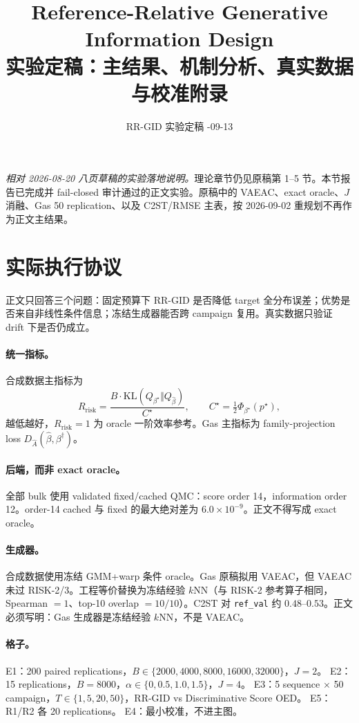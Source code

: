 \documentclass[UTF8,a4paper,11pt]{ctexart}
\title{\vspace{-8mm}Reference-Relative Generative Information Design\\[4pt]
\large 实验定稿：主结果、机制分析、真实数据与校准附录}
\author{RR-GID 实验定稿 \quad 2026-09-13}
\date{}
\begin{document}
\maketitle
\vspace{-6mm}
\noindent\textit{相对 2026-08-20 八页草稿的实验落地说明。}理论章节仍见原稿第 1--5 节。本节报告已完成并 fail-closed 审计通过的正文实验。原稿中的 VAEAC、exact oracle、\(J\) 消融、Gas 50 replication、以及 C2ST/RMSE 主表，按 2026-09-02 重规划不再作为正文主结果。

\section{实际执行协议}

正文只回答三个问题：固定预算下 RR-GID 是否降低 target 全分布误差；优势是否来自非线性条件信息；冻结生成器能否跨 campaign 复用。真实数据只验证 drift 下是否仍成立。

\paragraph{统一指标。}
合成数据主指标为
\[
R_{\mathrm{risk}}=\frac{B\cdot\mathrm{KL}(Q_{\beta^\star}\Vert Q_{\widehat\beta})}{C^\star},\qquad
C^\star=\tfrac12\Phi_{\beta^\star}(p^\star),
\]
越低越好，\(R_{\mathrm{risk}}=1\) 为 oracle 一阶效率参考。Gas 主指标为 family-projection loss \(D_{\widehat A}(\widehat\beta,\beta^\dagger)\)。

\paragraph{后端，而非 exact oracle。}
全部 bulk 使用 validated fixed/cached QMC：score order 14，information order 12。order-14 cached 与 fixed 的最大绝对差为 \(6.0\times10^{-9}\)。正文不得写成 exact oracle。

\paragraph{生成器。}
合成数据使用冻结 GMM+warp 条件 oracle。Gas 原稿拟用 VAEAC，但 VAEAC 未过 RISK-2/3。工程等价替换为冻结经验 \(k\)NN（与 RISK-2 参考算子相同，Spearman \(=1\)、top-10 overlap \(=10/10\)）。C2ST 对 \texttt{ref\_val} 约 \(0.48\)--\(0.53\)。正文必须写明：Gas 生成器是冻结经验 \(k\)NN，不是 VAEAC。

\paragraph{格子。}
E1：200 paired replications，\(B\in\{2000,4000,8000,16000,32000\}\)，\(J=2\)。
E2：15 replications，\(B=8000\)，\(\alpha\in\{0,0.5,1.0,1.5\}\)，\(J=4\)。
E3：5 sequence \(\times\) 50 campaign，\(T\in\{1,5,20,50\}\)，RR-GID vs Discriminative Score OED。
E5：R1/R2 各 20 replications。
E4：最小校准，不进主图。
\end{document}
